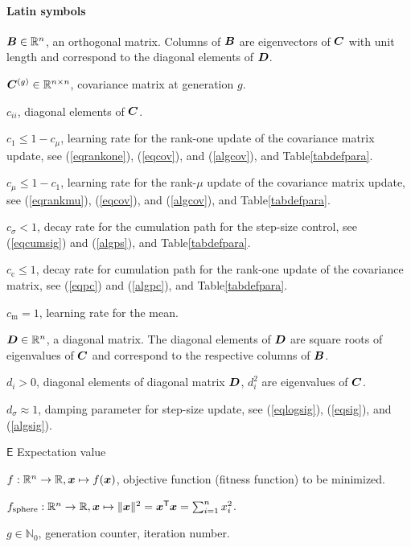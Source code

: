 \documentclass{article} %
\newcommand{\R}{\mathbb{R}}
\newcommand{\ve}[1]{\mathchoice{\mbox{\boldmath$\displaystyle#1$}}
  {\mbox{\boldmath$\textstyle#1$}} {\mbox{\boldmath$\scriptstyle#1$}}
  {\mbox{\boldmath$\scriptscriptstyle#1$}}}
\newcommand{\ma}[1]{\mathchoice{\mbox{\boldmath$\displaystyle#1$}}
  {\mbox{\boldmath$\textstyle#1$}} {\mbox{\boldmath$\scriptstyle#1$}}
  {\mbox{\boldmath$\scriptscriptstyle#1$}}}
\newcommand{\T}{\ensuremath{\mathsf{T}}}
\newcommand{\fsphere}{f_{\mathrm{sphere}}}
\newcommand{\N}{\ensuremath{n}}
\newcommand{\Nat}{\mathbb{N}}
\newcommand{\Rn}{\R^{\N}}
\newcommand{\summ}[2]{\sum_{#1=1}^{#2}}
\newcommand{\sig}{\ensuremath{\sigma}}
\newcommand{\Cg}{\ensuremath{\ma{C}^{(g)}}}
\newcommand{\cc}{\ensuremath{c_\mathrm{c}}}
\newcommand{\cs}{c_\sig}
\newcommand{\ds}{d_\sig}
\newcommand{\cm}{\ensuremath{c_\mathrm{m}}}%
\newcommand{\cone}{\ensuremath{c_1}}
\newcommand{\cmu}{\ensuremath{c_\mu}}
\newcommand{\ew}{d^2}
\newcommand{\sqrtew}{d}
\newcommand{\nref}[1]{\nolinebreak[4]\hspace{0.2845em plus0.05em minus0.17em}\nolinebreak[4]\ref{#1}}
\newcommand{\eqrefadd}[1]{(\ref{#1})} %
\newcommand{\eqsref}[1]{(\ref{#1})}
\begin{document}
\paragraph{Latin symbols}
\begin{description}\addtolength{\itemsep}{-0.9ex}
\item{$\ma{B}\in\Rn$, an orthogonal matrix. Columns of $\ma{B}$ are
    eigenvectors of $\ma{C}$ with unit length and correspond to the
    diagonal elements of $\ma{D}$.  }
\item{$\Cg\in\R^{\N\times\N}$, covariance matrix at generation $g$.}
\item $c_{ii}$, diagonal elements of $\ma{C}$.
\item $\cone\le1-\cmu$, learning rate for the rank-one update of 
   the covariance matrix update, see
  \eqrefadd{eqrankone}, \eqrefadd{eqcov}, and
  \eqrefadd{algcov}, and Table\nref{tabdefpara}.
\item $\cmu\le1-\cone$, learning rate for the rank-$\mu$ update of 
   the covariance matrix update, see
  \eqsref{eqrankmu}, \eqrefadd{eqcov}, and
  \eqrefadd{algcov}, and Table\nref{tabdefpara}.
\item $\cs<1$, decay rate for the cumulation path for the step-size
  control, see \eqsref{eqcumsig} and \eqrefadd{algps}, and
  Table\nref{tabdefpara}.
\item $\cc\le1$, decay rate for cumulation path for the rank-one update
  of the covariance matrix, see \eqsref{eqpc} and \eqrefadd{algpc},
  and Table\nref{tabdefpara}.
\item $\cm = 1$, learning rate for the mean.
\item{$\ma{D}\in\Rn$, a diagonal matrix. The diagonal elements of
    $\ma{D}$ are square roots of eigenvalues of $\ma{C}$ and
    correspond to the respective columns of $\ma{B}$. }
\item $\sqrtew_i>0$, diagonal elements of diagonal matrix $\ma{D}$, 
    $\ew_i$ are eigenvalues of $\ma{C}$. 
\item $\ds\approx1$, damping parameter for step-size update, see
  \eqsref{eqlogsig}, \eqrefadd{eqsig}, and \eqrefadd{algsig}.
\item $\mathsf{E}$ Expectation value
\item $f: \Rn\to\R, \ve{x}\mapsto f(\ve{x})$, objective function
  (fitness function) to be minimized.
\item $\fsphere: \Rn\to\R,
  \ve{x}\mapsto\|\ve{x}\|^2=\ve{x}^\T\ve{x}=\summ{i}{\N}x_i^2$.
\item{$g\in\Nat_0$, generation counter, iteration number. }

\end{description}
\end{document}
